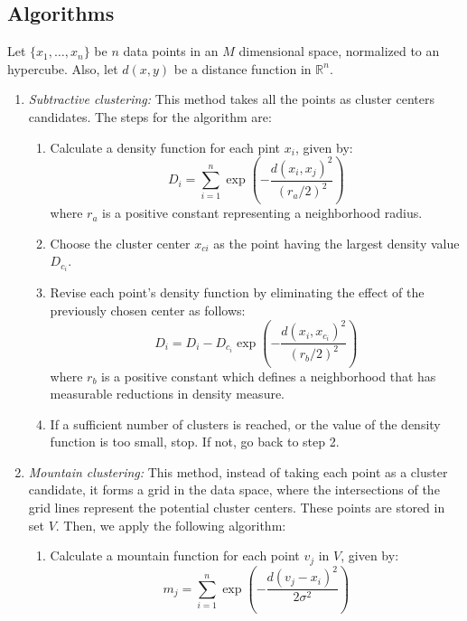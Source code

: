 \documentclass[conference]{IEEEtran}
\begin{document}
\subsection{Algorithms}
Let $\{x_1,\dots,x_n\}$ be $n$ data points in an $M$ dimensional space, normalized to an hypercube. Also, let $d(x,y)$ be a distance function in $\mathbb{R}^n$.
\begin{enumerate}
    \item \textit{Subtractive clustering:} This method takes all the points as cluster centers candidates. The steps for the algorithm are:
    \begin{enumerate}
        \item Calculate a density function for each pint $x_i$, given by:
    \begin{equation*}
        D_i = \sum_{i=1}^n \exp\left(-\frac{d(x_i,x_j)^2}{(r_a/2)^2}\right)
    \end{equation*}
    where $r_a$ is a positive constant representing a neighborhood radius. 
    \item Choose the cluster center $x_{ci}$ as the point having the largest density value $D_{c_i}$. 
    \item Revise each point's density function by eliminating the effect of the previously chosen center as follows:
\begin{equation*}
    D_i = D_i - D_{c_i}\exp\left(-\frac{d(x_i,x_{c_i})^2}{(r_b/2)^2}\right)
\end{equation*}
where $r_b$ is a positive constant which defines a neighborhood that has measurable reductions in density measure.
\item If a sufficient number of clusters is reached, or the value of the density function is too small, stop. If not, go back to step 2.
    \end{enumerate}
    \item \textit{Mountain clustering:}
    This method, instead of taking each point as a cluster candidate, it forms a grid in the data space, where the intersections of the grid lines represent the potential cluster centers. These points are stored in set $V$. Then, we apply the following algorithm:
    \begin{enumerate}
        \item Calculate a mountain function for each point $v_j$ in $V$, given by:
    \begin{equation*}
        m_j = \sum_{i=1}^n \exp\left(-\frac{d(v_j-x_i)^2}{2\sigma^2}\right)
    \end{equation*}

\end{enumerate}
\end{enumerate}
\end{document}

